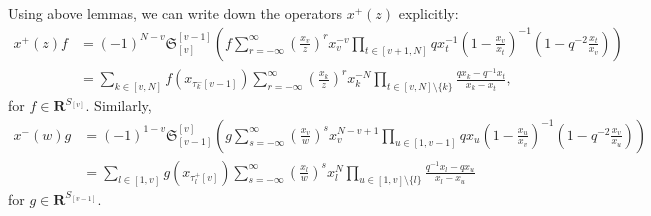 \documentclass[12pt]{amsart}
\theoremstyle{definition}
\theoremstyle{remark}
\numberwithin{equation}{subsection}
\begin{document}
Using above lemmas, we can write down the operators $x^+(z)$ explicitly:
\begin{equation*}
\begin{split}
   x^+(z) f 
   &=  (-1)^{N-v}
   {\mathfrak S}_{[v]}^{[v-1]}
    \left(f \sum_{r=-\infty}^\infty\left(\frac{x_v}{z}\right)^r
    x_v^{-v} %
    \prod_{t\in [v+1,N]} q x_t^{-1}
    \left( 1 - \frac{x_v}{x_t}\right)^{-1} 
    \left( 1 - q^{-2} \frac{x_t}{x_v}\right) \right) \\
&=
    \sum_{k\in [v,N]}
          f(x_{\tau_k^-[v-1]})
    \sum_{r=-\infty}^\infty\left(\frac{x_k}{z}\right)^r x_k^{-N}
    \prod_{t\in [v, N]\setminus \{k\}}
    \frac{q x_k - q^{-1} x_t}{x_k - x_t},
\end{split}
\end{equation*}
for $f\in \mathbf R^{S_{[v]}}$.
%
Similarly,
\begin{equation*}
\begin{split}
   x^-(w) g 
 &= (-1)^{1-v}
 {\mathfrak S}_{[v-1]}^{[v]}
  \left(g \sum_{s=-\infty}^\infty\left(\frac{x_v}{w}\right)^s
    {x_v^{N-v+1}} %
    \prod_{u\in [1,v-1]}  q x_u
     \left( 1 - \frac{x_u}{x_v}\right)^{-1} 
     \left( 1 - q^{-2} \frac{x_v}{x_u}\right) \right) \\
&= \sum_{l\in [1,v]}
     g(x_{\tau_l^+[v]})
  \sum_{s=-\infty}^\infty\left(\frac{x_l}{w}\right)^s x_l^{N}
    \prod_{u\in [1,v]\setminus\{l\}}
    \frac{q^{-1} x_l - q x_u}{x_l - x_u}
\end{split}
\end{equation*}
for $g\in\mathbf R^{S_{[v-1]}}$.
\end{document}
